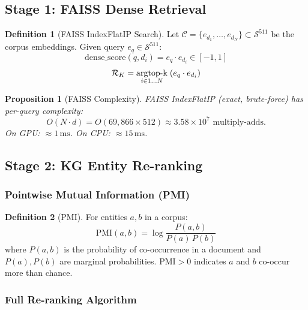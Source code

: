 \documentclass[12pt,a4paper]{article}
\theoremstyle{definition}
\newtheorem{definition}{Definition}[section]
\theoremstyle{plain}
\newtheorem{proposition}[theorem]{Proposition}
\theoremstyle{remark}
\newcommand{\Sph}{\mathcal{S}}
\newcommand{\argtopk}{\operatornamewithlimits{argtop\text{-}k}}
\begin{document}
\subsection{Stage 1: FAISS Dense Retrieval}

\begin{definition}[FAISS IndexFlatIP Search]
Let $\mathcal{C} = \{e_{d_1},\ldots,e_{d_N}\} \subset \Sph^{511}$ be the corpus embeddings.
Given query $e_q \in \Sph^{511}$:
\[
  \text{dense\_score}(q, d_i) = e_q \cdot e_{d_i} \in [-1, 1]
\]
\[
  \mathcal{R}_K = \argtopk_{i \in 1\ldots N}\; (e_q \cdot e_{d_i})
\]
\end{definition}

\begin{proposition}[FAISS Complexity]
FAISS IndexFlatIP (exact, brute-force) has per-query complexity:
\[
  O(N \cdot d) = O(69{,}866 \times 512) \approx 3.58 \times 10^7 \text{ multiply-adds}.
\]
On GPU: $\approx 1\,\text{ms}$. On CPU: $\approx 15\,\text{ms}$.
\end{proposition}

\subsection{Stage 2: KG Entity Re-ranking}

\subsubsection{Pointwise Mutual Information (PMI)}

\begin{definition}[PMI]
For entities $a, b$ in a corpus:
\[
  \mathrm{PMI}(a, b) = \log\frac{P(a,b)}{P(a)\,P(b)}
\]
where $P(a,b)$ is the probability of co-occurrence in a document and
$P(a), P(b)$ are marginal probabilities. $\mathrm{PMI} > 0$ indicates
$a$ and $b$ co-occur more than chance.
\end{definition}

\subsubsection{Full Re-ranking Algorithm}
\end{document}
